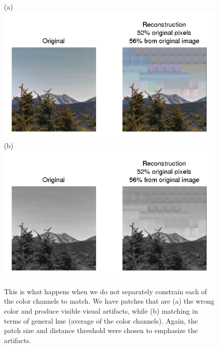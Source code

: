  \begin{figure}
(a)\includegraphics[width=0.9\linewidth]{Figures/197.png}
(b)\includegraphics[width=0.9\linewidth]{Figures/197_bw.png}
\caption{This is what happens when we do not separately constrain each of the color channels to match. We have patches that are (a) the wrong color and produce visible visual artifacts, while (b) matching in terms of general hue (average of the color channels). Again, the patch size and distance threshold were chosen to emphasize the artifacts.}
\label{fig:colProblem}
\end{figure}

